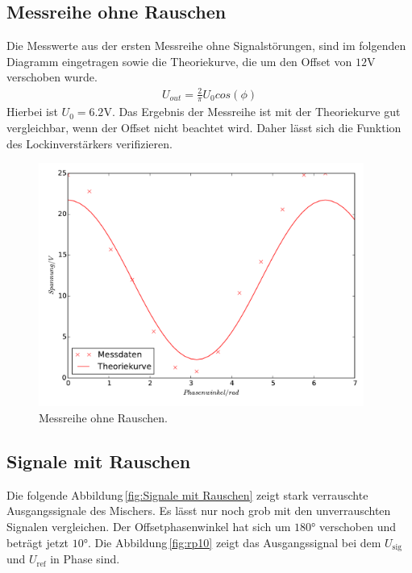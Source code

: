 \subsection{Messreihe ohne Rauschen}
\label{sec:Messreihe ohne Rauschen}
Die Messwerte aus der ersten Messreihe ohne Signalstörungen, sind im folgenden
Diagramm eingetragen sowie die Theoriekurve, die um den Offset von $12\si{\volt}$
verschoben wurde.
\begin{align*}
U_{out}=\frac{2}{\pi}U_0cos(\phi)
\end{align*}
 Hierbei ist $U_0=6.2\si{\volt}$. Das Ergebnis der Messreihe ist
mit der Theoriekurve gut vergleichbar, wenn der Offset nicht beachtet wird.
Daher lässt sich die Funktion des Lockinverstärkers verifizieren.
\begin{figure}
  \centering
  \includegraphics[height=8cm]{or_signal.pdf}
  \caption{Messreihe ohne Rauschen.}
  \label{fig:Mor}
\end{figure}

\subsection{Signale mit Rauschen}
\label{sec:Signale mit Rauschen}
Die folgende Abbildung\,\ref{fig:Signale mit Rauschen} zeigt stark verrauschte
Ausgangssignale des Mischers. Es lässt nur noch grob mit den unverrauschten
Signalen vergleichen. Der Offsetphasenwinkel hat sich um $180°$ verschoben und beträgt jetzt $10°$.
Die Abbildung\,\ref{fig:rp10} zeigt das Ausgangssignal bei dem $U_\text{sig}$ und
$U_\text{ref}$ in Phase sind.

